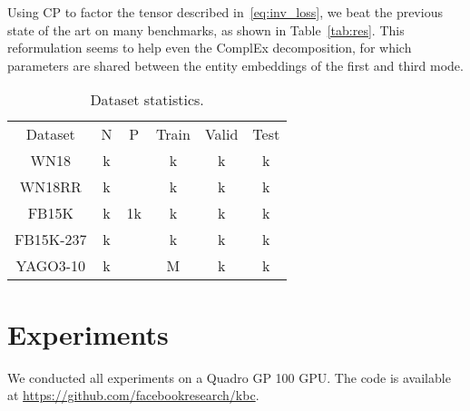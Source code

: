 \documentclass{article}
\newcommand{\CP}{{CP}\xspace}
\newcommand{\complex}{{ComplEx}\xspace}
\newcommand{\fb}{{FB15K}\xspace}
\newcommand{\fbd}{{FB15K-237}\xspace}
\newcommand{\wn}{{WN18}\xspace}
\newcommand{\wnrr}{{WN18RR}\xspace}
\newcommand{\yago}{{YAGO3-10}\xspace}
\begin{document}
Using \CP to factor the tensor described in~\eqref{eq:inv_loss}, we beat the previous state of the art on many benchmarks, as shown in Table~\ref{tab:res}. This reformulation seems to help even the \complex decomposition, for which parameters are shared between the entity embeddings of the first and third mode.

\begin{table}[t]
\centering
\begin{tabular}{cccccc}
\toprule
Dataset & N & P & Train & Valid & Test \\
\wn & k &  & k & k & k \\
\wnrr & k &  & k & k & k \\
\fb & k & 1k & k & k & k \\
\fbd & k &  & k & k & k \\
\yago & k &  & M & k & k \\
\bottomrule
\end{tabular}
\caption{Dataset statistics.}
\label{tab:stats}
\end{table}


\section{Experiments}
We conducted all experiments on a Quadro GP 100 GPU. The code is available at \url{https://github.com/facebookresearch/kbc}. 
\end{document}
